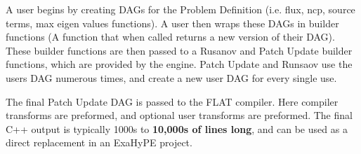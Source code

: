 A user begins by creating DAGs for the Problem Definition (i.e. flux, ncp, source terms, max eigen values functions).
A user then wraps these DAGs in builder functions (A function that when called returns a new version of their DAG).
These builder functions are then passed to a Rusanov and Patch Update builder functions, which are provided by the engine.
Patch Update and Runsaov use the users DAG numerous times, and create a new user DAG for every single use.

The final Patch Update DAG is passed to the FLAT compiler.
Here compiler transforms are preformed, and optional user transforms are preformed.
The final C++ output is typically 1000s to \textbf{10,000s of lines long}, and can be used as a direct replacement in an ExaHyPE project.


